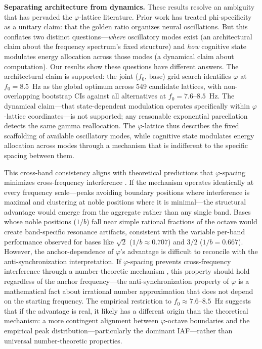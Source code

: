\documentclass[11pt,a4paper]{article}
\newcommand{\phisym}{\varphi}
\newcommand{\fzero}{f_0}
\begin{document}
\textbf{Separating architecture from dynamics.} These results resolve an ambiguity that has pervaded the $\phisym$-lattice literature. Prior work has treated phi-specificity as a unitary claim: that the golden ratio organizes neural oscillations. But this conflates two distinct questions---\emph{where} oscillatory modes exist (an architectural claim about the frequency spectrum's fixed structure) and \emph{how} cognitive state modulates energy allocation across those modes (a dynamical claim about computation). Our results show these questions have different answers. The architectural claim is supported: the joint ($\fzero$, base) grid search identifies $\phisym$ at $\fzero = 8.5$~Hz as the global optimum across 549 candidate lattices, with non-overlapping bootstrap CIs against all alternatives at $\fzero = 7.6$--$8.5$~Hz. The dynamical claim---that state-dependent modulation operates specifically within $\phisym$-lattice coordinates---is not supported; any reasonable exponential parcellation detects the same gamma reallocation. The $\phisym$-lattice thus describes the fixed scaffolding of available oscillatory modes, while cognitive state modulates energy allocation across modes through a mechanism that is indifferent to the specific spacing between them.

This cross-band consistency aligns with theoretical predictions that $\phisym$-spacing minimizes cross-frequency interference \parencite{pletzer2010golden, kramer2022golden}. If the mechanism operates identically at every frequency scale---peaks avoiding boundary positions where interference is maximal and clustering at noble positions where it is minimal---the structural advantage would emerge from the aggregate rather than any single band. Bases whose noble positions ($1/b$) fall near simple rational fractions of the octave would create band-specific resonance artifacts, consistent with the variable per-band performance observed for bases like $\sqrt{2}$ ($1/b \approx 0.707$) and $3/2$ ($1/b = 0.667$). However, the anchor-dependence of $\phisym$'s advantage is difficult to reconcile with the anti-synchronization interpretation. If $\phisym$-spacing prevents cross-frequency interference through a number-theoretic mechanism \parencite{pletzer2010golden}, this property should hold regardless of the anchor frequency---the anti-synchronization property of $\phisym$ is a mathematical fact about irrational number approximation that does not depend on the starting frequency. The empirical restriction to $\fzero \approx 7.6$--$8.5$~Hz suggests that if the advantage is real, it likely has a different origin than the theoretical mechanism: a more contingent alignment between $\phisym$-octave boundaries and the empirical peak distribution---particularly the dominant IAF---rather than universal number-theoretic properties.
\end{document}
